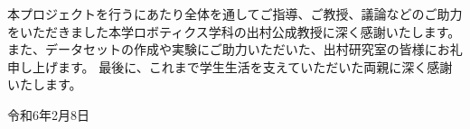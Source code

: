 
本プロジェクトを行うにあたり全体を通してご指導、ご教授、議論などのご助力をいただきました本学ロボティクス学科の出村公成教授に深く感謝いたします。
また、データセットの作成や実験にご助力いただいた、出村研究室の皆様にお礼申し上げます。
最後に、これまで学生生活を支えていただいた両親に深く感謝いたします。

\begin{flushright}
令和6年2月8日
\end{flushright}
